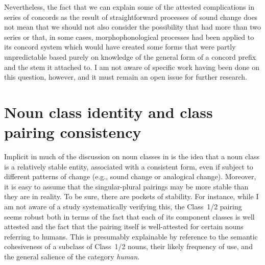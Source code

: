 \documentclass[output=paper ,collection	  ,collectionchapter ,biblatexbackend=biber   ]{langscibook}
\begin{document}
Nevertheless, the fact that we can explain some of the attested complications in
series of concords as the result of straightforward processes of sound change
does not mean that we should not also consider the possibility that
 had more than two series or that, in some cases,
morphophonological processes had been applied to its concord system which
would have created some forms that were partly unpredictable based purely on
knowledge of the general form of a concord prefix and the stem it attached to. I
am not aware of specific work having been done on this question, however, and it
must remain an open issue for further research.



\section{Noun class identity and class pairing consistency \label{Identity}}\label{sec:good:6}

Implicit in much of the discussion on noun classes in  is the
idea that a noun class is a relatively stable entity, associated with a
consistent form, even if subject to different patterns of change (e.g., sound
change or analogical change). Moreover, it is easy to assume that
the singular-plural pairings may be more stable than they are in reality. To be
sure, there are pockets of stability. For instance, while I am not aware of a
study systematically verifying this, the Class~1/2 pairing seems robust both in
terms of the fact that each of its component classes is well attested and
the fact that the pairing itself is well-attested for certain nouns referring to
humans. This is presumably explainable by reference to the semantic cohesiveness
of a subclass of Class~1/2 nouns, their likely frequency of use, and the general
salience of the category \emph{human}.
\end{document}
